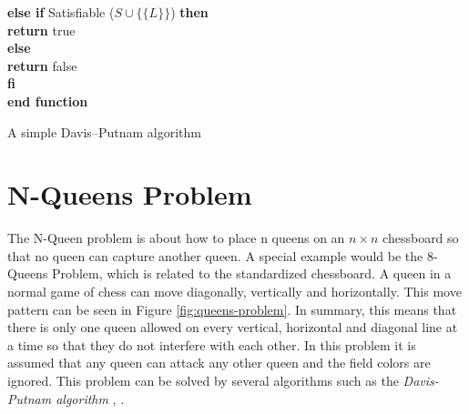 \begin{listing}[h!]
    \hspace*{0.5cm} \textbf{else if} Satisfiable ($S \cup \{\{L\}\}$) \textbf{then}\\
      \hspace*{1.0cm} \textbf{return} true\\
    \hspace*{0.5cm} \textbf{else}\\
      \hspace*{1.0cm} \textbf{return} false\\
    \hspace*{0.5cm} \textbf{fi}\\
  \textbf{end function}
  \caption{A simple Davis–Putnam algorithm \cite{Zhang2000}}
  \label{code:recursiveDavisPutnam}
\end{listing}

\section{N-Queens Problem}
\label{sec:sciQueens}
The N-Queen problem is about how to place n queens on an $n \times n$ chessboard so that no queen can capture another queen. A special example would be the 8-Queens Problem, which is related to the standardized chessboard. A queen in a normal game of chess can move diagonally, vertically and horizontally. This move pattern can be seen in Figure \ref{fig:queens-problem}. In summary, this means that there is only one queen allowed on every vertical, horizontal and diagonal line at a time so that they do not interfere with each other. In this problem it is assumed that any queen can attack any other queen and the field colors are ignored. This problem can be solved by several algorithms such as the \textit{Davis-Putnam algorithm} \cite{OMCA2019}, \cite{GeeksGeeks2019} \cite{Stroetman2019}.

